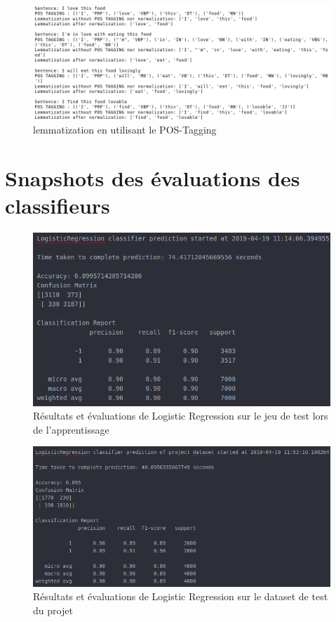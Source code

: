 \documentclass[12pt,a4paper]{report}
\theoremstyle{definition}
\begin{document}
\begin{appendices}
\begin{figure}[!ht]
  \centering
  \includegraphics[scale=0.4]{images/snapshots/preprocessing/lemmatization.png}
  \caption{lemmatization en utilisant le POS-Tagging}
  \label{fig:lemmatization}
\end{figure}

\chapter{Snapshots des évaluations des classifieurs}
\begin{figure}[!ht]
  \centering
  \includegraphics[scale=0.5]{images/snapshots/predictions/logistic_regression/training_set_results.png}
  \caption{Résultats et évaluations de Logistic Regression sur le jeu de test lors de l'apprentissage}
  \label{fig:lr_fit_test}
\end{figure}

\begin{figure}[!ht]
  \centering
  \includegraphics[scale=0.5]{images/snapshots/predictions/logistic_regression/project_dataset_results.png}
  \caption{Résultats et évaluations de Logistic Regression sur le dataset de test du projet}
  \label{fig:lr_project_dataset}
\end{figure}


\end{appendices}
\end{document}
